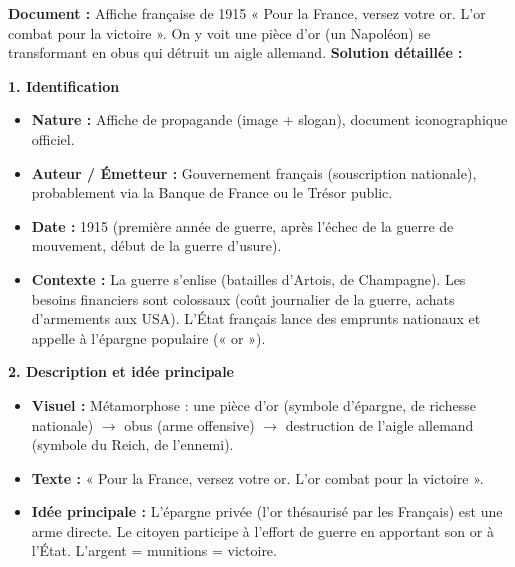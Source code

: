 \documentclass[11pt]{article}
\begin{document}
\begin{exoresolu}
\textbf{Document :} Affiche française de 1915 « Pour la France, versez votre or. L'or combat pour la victoire ». On y voit une pièce d'or (un Napoléon) se transformant en obus qui détruit un aigle allemand.
\tcblower
\textbf{Solution détaillée :}

\noindent \textbf{1. Identification}
\begin{itemize}
\item \textbf{Nature :} Affiche de propagande (image + slogan), document iconographique officiel.
\item \textbf{Auteur / Émetteur :} Gouvernement français (souscription nationale), probablement via la Banque de France ou le Trésor public.
\item \textbf{Date :} 1915 (première année de guerre, après l'échec de la guerre de mouvement, début de la guerre d'usure).
\item \textbf{Contexte :} La guerre s'enlise (batailles d'Artois, de Champagne). Les besoins financiers sont colossaux (coût journalier de la guerre, achats d'armements aux USA). L'État français lance des emprunts nationaux et appelle à l'épargne populaire (« or »).
\end{itemize}

\noindent \textbf{2. Description et idée principale}
\begin{itemize}
\item \textbf{Visuel :} Métamorphose : une pièce d'or (symbole d'épargne, de richesse nationale) $\rightarrow$ obus (arme offensive) $\rightarrow$ destruction de l'aigle allemand (symbole du Reich, de l'ennemi).
\item \textbf{Texte :} « Pour la France, versez votre or. L'or combat pour la victoire ».
\item \textbf{Idée principale :} L'épargne privée (l'or thésaurisé par les Français) est une arme directe. Le citoyen participe à l'effort de guerre en apportant son or à l'État. L'argent = munitions = victoire.
\end{itemize}


\end{exoresolu}
\end{document}
